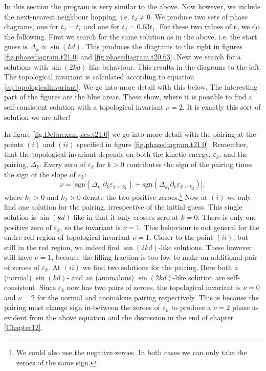 In this section the program is very similar to the above. Now however, we include the next-nearest neighbour hopping, i.e. $t_2 \neq 0$. We produce two sets of phase diagrams, one for $t_2 = t_1$ and one for $t_2 = 0.63t_1$. For these two values of $t_2$ we do the following. First we search for the same solution as in the above, i.e. the start guess is $\Delta_k \propto \sin(kd)$. This produces the diagrams to the right in figures \ref{fig.phasediagram.t21.0} and \ref{fig.phasediagram.t20.63}. Next we search for a solutions with $\sin(2kd)$-like behaviour. This results in the diagrams to the left. The topological invariant is calculated according to equation \eqref{eq.topologicalinvariant}. We go into more detail with this below. The interesting part of the figures are the blue areas. These show, where it is possible to find a self-consistent solution with a topological invariant $\nu = 2$. It is exactly this sort of solution we are after!  

In figure \ref{fig.Deltaexamples.t21.0} we go into more detail with the pairing at the points $(i)$ and $(ii)$ specified in figure \ref{fig.phasediagram.t21.0}. Remember, that the topological invariant depends on both the kinetic energy, $\varepsilon_k$, and the pairing, $\Delta_k$. Every zero of $\varepsilon_k$ for $k > 0$ contributes the sign of the pairing times the sign of the slope of $\varepsilon_k$:
\begin{equation}
\nu = \left| \text{sgn}\left(\Delta_{k_1}\partial_k\varepsilon_{k = k_1}\right) + \text{sgn}\left(\Delta_{k_1}\partial_k\varepsilon_{k = k_2}\right)\right|, \nonumber
\end{equation}
where $k_1 > 0$ and $k_2 > 0$ denote the two positive zeroes.\footnote{We could also use the negative zeroes. In both cases we can only take the zeroes of the same sign.} Now at $(i)$ we only find one solution for the pairing, irrespective of the initial guess. This single solution is $\sin(kd)$-like in that it only crosses zero at $k = 0$. There is only one positive zero of $\varepsilon_k$, so the invariant is $\nu = 1$. This behaviour is not general for the entire red region of topological invariant $\nu = 1$. Closer to the point $(ii)$, but still in the red region, we indeed find $\sin(2kd)$-like solutions. These however still have $\nu = 1$, because the filling fraction is too low to make an additional pair of zeroes of $\varepsilon_k$. At $(ii)$ we find two solutions for the pairing. Here both a (normal) $\sin(kd)$- and an (anomalous) $\sin(2kd)$-like solution are self-consistent. Since $\varepsilon_k$ now has two pairs of zeroes, the topological invariant is $\nu = 0$ and $\nu = 2$ for the normal and anomalous pairing respectively. This is because the pairing must change sign in-between the zeroes of $\varepsilon_k$ to produce a $\nu = 2$ phase as evident from the above equation and the discussion in the end of chapter \ref{Chapter12}. 

